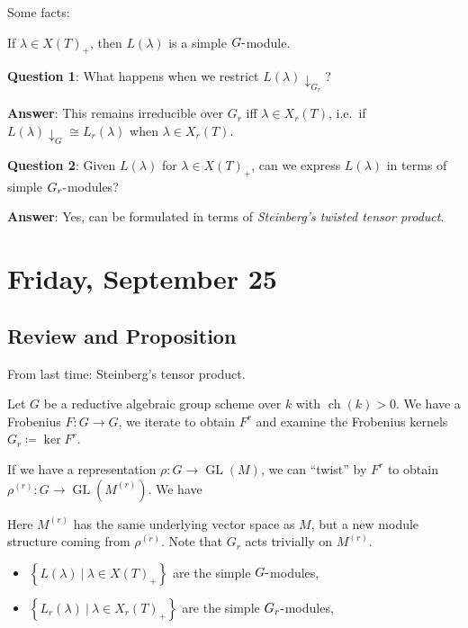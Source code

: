 Some facts:

If \(\lambda \in X(T)_+\), then \(L(\lambda)\) is a simple
\(G{\hbox{-}}\)module.

\textbf{Question 1}: What happens when we restrict
\(L(\lambda)\downarrow_{G_r}\)?

\textbf{Answer}: This remains irreducible over \(G_r\) iff
\(\lambda \in X_r(T)\), i.e.~if
\(L(\lambda)\downarrow_{G} \cong L_r(\lambda)\) when
\(\lambda \in X_r(T)\).

\textbf{Question 2}: Given \(L(\lambda)\) for \(\lambda \in X(T)_+\),
can we express \(L(\lambda)\) in terms of simple
\(G_r{\hbox{-}}\)modules?

\textbf{Answer}: Yes, can be formulated in terms of \emph{Steinberg's
twisted tensor product}.

\hypertarget{friday-september-25}{%
\section{Friday, September 25}\label{friday-september-25}}

\hypertarget{review-and-proposition}{%
\subsection{Review and Proposition}\label{review-and-proposition}}

From last time: Steinberg's tensor product.

Let \(G\) be a reductive algebraic group scheme over \(k\) with
\(\operatorname{ch}(k) > 0\). We have a Frobenius \(F:G\to G\), we
iterate to obtain \(F^r\) and examine the Frobenius kernels
\(G_r\coloneqq\ker F^r\).

If we have a representation \(\rho: G\to \operatorname{GL}(M)\), we can
``twist'' by \(F^r\) to obtain
\(\rho^{(r)}: G \to \operatorname{GL}(M^{(r)})\). We have

Here \(M^{(r)}\) has the same underlying vector space as \(M\), but a
new module structure coming from \(\rho^{(r)}\). Note that \(G_r\) acts
trivially on \(M^{(r)}\).

\begin{itemize}
\tightlist
\item
  \(\left\{{L(\lambda) {~\mathrel{\Big|}~}\lambda \in X(T)_+}\right\}\)
  are the simple \(G{\hbox{-}}\)modules,
\item
  \(\left\{{L_r(\lambda) {~\mathrel{\Big|}~}\lambda \in X_r(T)_+}\right\}\)
  are the simple \(G_r{\hbox{-}}\)modules,
\end{itemize}

